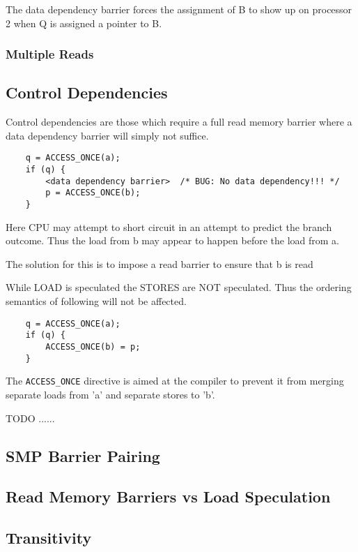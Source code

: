 \documentclass{article}
\begin{document}
The data dependency barrier forces the assignment of B to show up on
processor 2 when Q is assigned a pointer to B.

\subsubsection{Multiple Reads}


\subsection{Control Dependencies}

Control dependencies are those which require a full read memory
barrier where a data dependency barrier will simply not suffice.

\begin{lstlisting}
  	q = ACCESS_ONCE(a);
	if (q) {
		<data dependency barrier>  /* BUG: No data dependency!!! */
		p = ACCESS_ONCE(b);
	}
\end{lstlisting}

Here CPU may attempt to short circuit in an attempt to predict the
branch outcome. Thus the load from b may appear to happen before the
load from a.

The solution for this is to impose a read barrier to ensure that b is
read


While LOAD is speculated the STORES are NOT speculated. Thus the
ordering semantics of following will not be affected.

\begin{lstlisting}
	q = ACCESS_ONCE(a);
	if (q) {
		ACCESS_ONCE(b) = p;
	}  
\end{lstlisting}


The \lstinline{ACCESS_ONCE} directive is aimed at the compiler to
prevent it from merging separate loads from 'a' and separate stores to
'b'.

TODO ......

\subsection{SMP Barrier Pairing}




\subsection{Read Memory Barriers vs Load Speculation}

\subsection{Transitivity}
\end{document}
